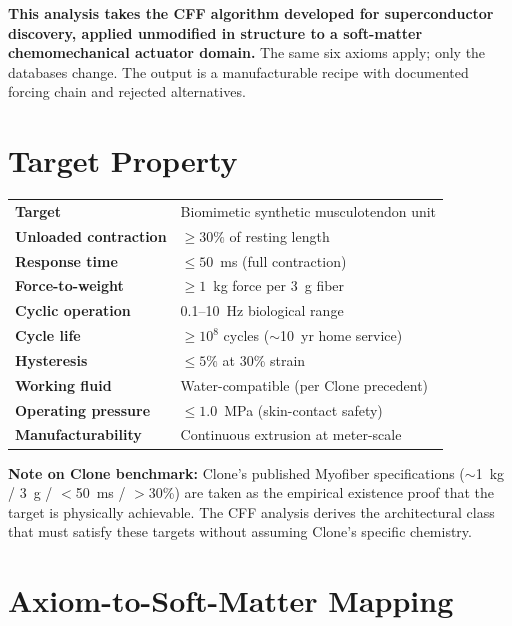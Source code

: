 \documentclass[11pt, a4paper]{article}
\begin{document}
\textbf{This analysis takes the CFF algorithm developed for
superconductor discovery, applied unmodified in structure to a
soft-matter chemomechanical actuator domain.} The same six axioms
apply; only the databases change. The output is a manufacturable
recipe with documented forcing chain and rejected alternatives.

\tableofcontents

\section{Target Property}

\begin{center}
\begin{tabular}{@{}ll@{}}
\toprule
\textbf{Target} & Biomimetic synthetic musculotendon unit \\
\textbf{Unloaded contraction} & $\geq 30\%$ of resting length \\
\textbf{Response time} & $\leq 50$~ms (full contraction) \\
\textbf{Force-to-weight} & $\geq 1$~kg force per 3~g fiber \\
\textbf{Cyclic operation} & 0.1--10~Hz biological range \\
\textbf{Cycle life} & $\geq 10^8$ cycles ($\sim$10~yr home service) \\
\textbf{Hysteresis} & $\leq 5\%$ at 30\% strain \\
\textbf{Working fluid} & Water-compatible (per Clone precedent) \\
\textbf{Operating pressure} & $\leq 1.0$~MPa (skin-contact safety) \\
\textbf{Manufacturability} & Continuous extrusion at meter-scale\\
\bottomrule
\end{tabular}
\end{center}

\textbf{Note on Clone benchmark:} Clone's published Myofiber
specifications ($\sim$1~kg / 3~g / $<$50~ms / $>$30\%) are taken
as the empirical existence proof that the target is physically
achievable. The CFF analysis derives the architectural class that
must satisfy these targets without assuming Clone's specific
chemistry.

\section{Axiom-to-Soft-Matter Mapping}
\end{document}
